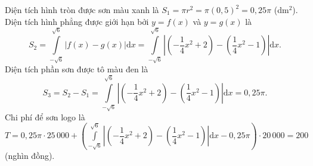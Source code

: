 \begin{ex}
{Diện tích hình tròn được sơn màu xanh là $S_1=\pi r^2=\pi (0{,}5)^2=0{,}25\pi $ (dm$^2$).\\
Diện tích hình phẳng được giới hạn bởi $y=f(x)$ và $y=g(x)$ là
\[S_2=\displaystyle \int \limits _{-\sqrt{6}}^{\sqrt{6}}\left|f(x)-g(x) \right|\mathrm{d}x=\displaystyle \int \limits _{-\sqrt{6}}^{\sqrt{6}}\left|\left(-\dfrac{1}{4}x^2+2\right) -\left(\dfrac{1}{4}x^2-1\right) \right|\mathrm{d}x.\]
Diện tích phần sơn được tô màu đen là \[S_3=S_2-S_1=\displaystyle \int \limits _{-\sqrt{6}}^{\sqrt{6}}\left|\left(-\dfrac{1}{4}x^2+2\right) -\left(\dfrac{1}{4}x^2-1\right) \right|\mathrm{d}x=0{,}25\pi. \]
Chi phí để sơn logo là\\
$T=0{,}25\pi \cdot 25\,000+\left(\displaystyle \int \limits _{-\sqrt{6}}^{\sqrt{6}}\left|\left(-\dfrac{1}{4}x^2+2\right) -\left(\dfrac{1}{4}x^2-1\right) \right|\mathrm{d}x-0{,}25\pi \right)\cdot 20\,000=200$ (nghìn đồng).
}
\end{ex}

